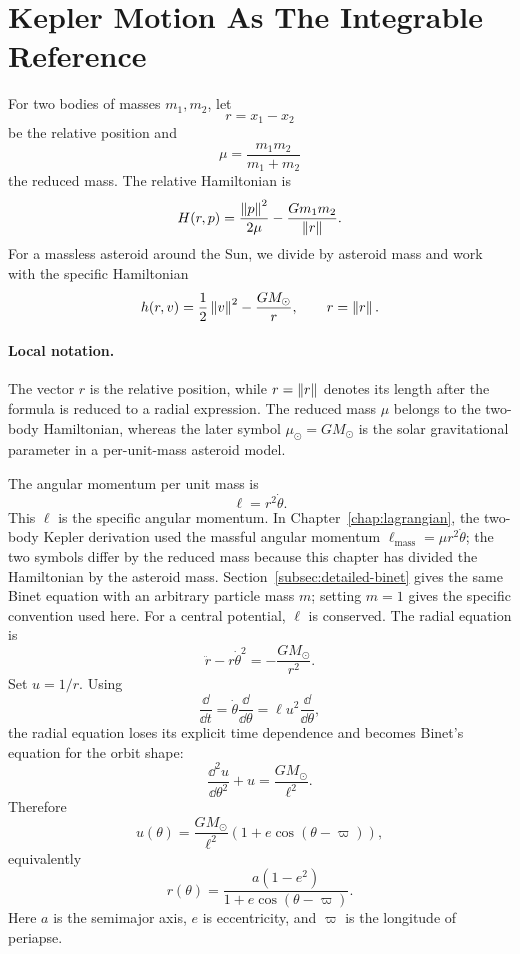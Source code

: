 \section{Kepler Motion As The Integrable Reference}
\label{sec:kepler-perturbation}

For two bodies of masses \(m_1,m_2\), let
\[
  r=x_1-x_2
\]
be the relative position and
\[
  \mu=\frac{m_1m_2}{m_1+m_2}
\]
the reduced mass. The relative Hamiltonian is
\[
  H(r,p)=\frac{\left\lVert p\right\rVert^2}{2\mu}-\frac{Gm_1m_2}{\left\lVert r\right\rVert}.
\]
For a massless asteroid around the Sun, we divide by asteroid mass and work
with the specific Hamiltonian
\[
  h(r,v)=\frac12\left\lVert v\right\rVert^2-\frac{GM_\odot}{r},
  \qquad r=\left\lVert r\right\rVert.
\]

\paragraph{Local notation.}
The vector \(r\) is the relative position, while \(r=\left\lVert r\right\rVert\) denotes its
length after the formula is reduced to a radial expression.  The reduced mass
\(\mu\) belongs to the two-body Hamiltonian, whereas the later symbol
\(\mu_\odot=GM_\odot\) is the solar gravitational parameter in a
per-unit-mass asteroid model.

\begin{derivation}
The angular momentum per unit mass is
\[
  \ell=r^2\dot\theta.
\]
This \(\ell\) is the specific angular momentum. In
Chapter~\ref{chap:lagrangian}, the two-body Kepler derivation used the massful
angular momentum \(\ell_{\mathrm{mass}}=\mu r^2\dot\theta\); the two symbols
differ by the reduced mass because this chapter has divided the Hamiltonian by
the asteroid mass. Section~\ref{subsec:detailed-binet} gives the same Binet
equation with an arbitrary particle mass \(m\); setting \(m=1\) gives the
specific convention used here.
For a central potential, \(\ell\) is conserved. The radial equation is
\[
  \ddot r-r\dot\theta^2=-\frac{GM_\odot}{r^2}.
\]
Set \(u=1/r\). Using
\[
  \frac{\dd}{\dd t}=\dot\theta\frac{\dd}{\dd\theta}
  =
  \ell u^2\frac{\dd}{\dd\theta},
\]
the radial equation loses its explicit time dependence and becomes Binet's
equation for the orbit shape:
\[
  \frac{\dd^2u}{\dd\theta^2}+u=\frac{GM_\odot}{\ell^2}.
\]
Therefore
\[
  u(\theta)=\frac{GM_\odot}{\ell^2}\left(1+e\cos(\theta-\varpi)\right),
\]
equivalently
\[
  \boxed{
  r(\theta)=\frac{a(1-e^2)}{1+e\cos(\theta-\varpi)}
  }.
\]
Here \(a\) is the semimajor axis, \(e\) is eccentricity, and \(\varpi\) is the
longitude of periapse.
\end{derivation}

